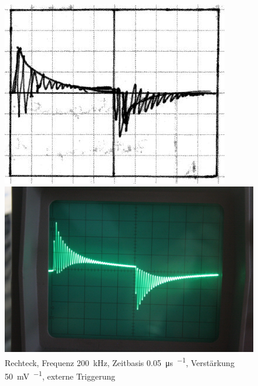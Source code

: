 \begin{figure}
	\centering
	\begin{minipage}{.45\linewidth}
	\includegraphics[width=\linewidth]{Skizzen/IMG_0763-1500.jpg}
	\end{minipage}
	\hfill
	\begin{minipage}{.45\linewidth}
	\includegraphics[width=\linewidth]{Fotos/IMG_0763-1500.jpg}
	\end{minipage}
	\caption{%
		Rechteck, Frequenz \SI{200}{\kilo\hertz},
		Zeitbasis \SI{.05}{\micro\second\per\division},
		Verstärkung \SI{50}{\milli\volt\per\division},
		externe Triggerung
	}
	\label{fig:0763}
\end{figure}


